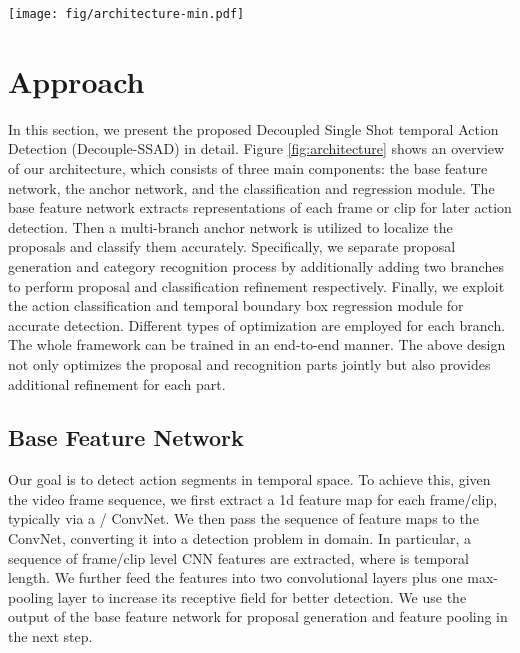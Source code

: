 \documentclass{article}
\begin{document}
\begin{figure*}[ht]
    \texttt{[image: fig/architecture-min.pdf]}
    \centering
    \caption{\small The framework overview of our Decouple-SSAD. The input frame sequence is first encoded to  feature sequence through  ConvNet.
    A multi-branch anchor network is designed to produce multiple sets of feature maps.
    Particularly, it consists of a main stream and two branches derived from it, i.e., the refined classification branch and proposal branch.
    The Main Stream performs classification and regression simultaneously.
    The Classification and Proposal Branches focus on learning specialized features useful for themselves, which incorporate the semantic information of deep layers from main stream through deconvolution.
    The action classification loss and location regression loss are utilized to optimize different branches. The whole network is trained in an end-to-end manner.
    }
    \label{fig:architecture}
\end{figure*}

\section{Approach}
In this section, we present the proposed Decoupled Single Shot temporal Action Detection (Decouple-SSAD) in detail. Figure \ref{fig:architecture} shows an overview of our architecture, which consists of three main components: the base feature network, the anchor network, and the classification
and regression module.
The base feature network extracts representations of each frame or clip for later action detection.
Then a multi-branch anchor network is utilized to localize the proposals and classify them accurately. Specifically, we separate proposal generation and category recognition process by additionally adding two branches to perform proposal and classification refinement respectively. Finally, we exploit the action classification and temporal boundary box regression module for accurate detection. Different types of optimization are employed for each branch.
The whole framework can be trained in an end-to-end manner.
The above design not only optimizes the proposal and recognition parts jointly but also provides additional refinement for each part.

\subsection{Base Feature Network}
Our goal is to detect action segments in  temporal space. To achieve this, given the video frame sequence, we first extract a 1d feature map for each frame/clip, typically via a / ConvNet. We then pass the sequence of feature maps to the  ConvNet, converting it into a detection problem in  domain. In particular, a sequence of frame/clip level CNN features  are extracted, where  is temporal length. We further feed the features into two  convolutional layers plus one max-pooling layer to increase its receptive field for better detection. We use the output of the base feature network for proposal generation and feature pooling in the next step.
\end{document}
